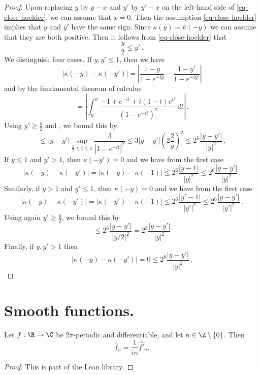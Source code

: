 \begin{proof}
\leanok
    Upon replacing $y$ by $y-x$ and $y'$ by $y'-x$ on the left-hand side of \eqref{eq-close-hoelder}, we can assume that $x = 0$. Then the assumption \eqref{eq-close-hoelder} implies that $y$ and $y'$ have the same sign. Since $\kappa(y) = \bar \kappa(-y)$ we can assume that they are both positive. Then it follows from \eqref{eq-close-hoelder} that
    $$
        \frac{y}{2} \le y' \,.
    $$
    We distinguish four cases. If $y, y' \le 1$, then we have
    $$
        |\kappa(-y) - \kappa(-y')| = \left| \frac{1 - y}{1- e^{-iy}} - \frac{1 - y'}{1- e^{-iy'}}\right|
    $$
    and by the fundamental theorem of calculus
    $$
        = \left| \int_{y'}^{y} \frac{-1 + e^{-it} + i(1-t)e^{it}}{(1 - e^{-it})^2} \,dt \right|\,.
    $$
    Using $y' \ge \frac{y}{2}$ and , we bound this by
    $$
        \le |y - y'| \sup_{\frac{y}{2} \le t \le 1} \frac{3}{|1 - e^{-it}|^2} \le 3 |y-y'| (2 \frac{2}{y})^2 \le 2^{6} \frac{|y-y'|}{|y|^2}\,.
    $$
    If $y \le 1$ and $y' > 1$, then $\kappa(-y') = 0$ and we have from the first case
    $$
        |\kappa(-y) - \kappa(-y')| = |\kappa(-y) - \kappa(-1)| \le 2^{6} \frac{|y-1|}{|y|^2} \le 2^{6} \frac{|y-y'|}{|y|^2}\,.
    $$
    Similarly, if $y > 1$ and $y' \le 1$, then $\kappa(-y) = 0$ and we have from the first case
    $$
        |\kappa(-y) - \kappa(-y')| = |\kappa(-y') - \kappa(-1)| \le 2^{6} \frac{|y'-1|}{|y'|^2} \le 2^{6} \frac{|y-y'|}{|y'|^2}\,.
    $$
    Using again $y' \ge \frac{y}{2}$, we bound this by
    $$
        \le 2^{6} \frac{|y-y'|}{|y / 2|^2} = 2^{8} \frac{|y-y'|}{|y|^2}
    $$
    Finally, if $y, y' > 1$ then
    $$
        |\kappa(-y) - \kappa(-y')| = 0 \le 2^{8} \frac{|y-y'|}{|y|^2}\,.
    $$
\end{proof}






\section{Smooth functions.}
\label{10smooth}
\begin{lemma}
\label{fourier-coeff-derivative}
\leanok
Let $f:\R \to \C$ be $2\pi$-periodic and differentiable, and let $n \in \Z \setminus \{0\}$. Then
\begin{equation}
    \widehat{f}_n = \frac{1}{i n} \widehat{f'}_n.
\end{equation}
\end{lemma}
\begin{proof}
\leanok
This is part of the Lean library.
\end{proof}

